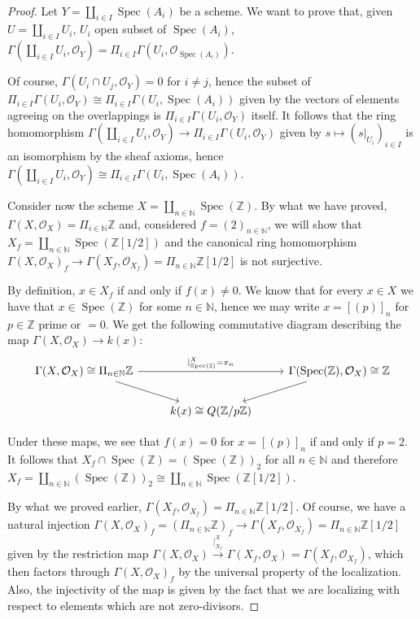 \documentclass{article}
\newcommand{\numberset}{\mathbb}
\newcommand{\N}{\numberset{N}}
\newcommand{\Z}{\numberset{Z}}
\newcommand{\exercise}[1]{\noindent {\bf Exercise #1}}
\DeclareMathOperator{\Spec}{Spec}
\begin{document}
~\\
\exercise{4}

\begin{proof}
    Let $Y=\amalg_{i\in I}\Spec(A_i)$ be a scheme. We want to prove that, given
    $U=\amalg_{i\in I} U_i$, $U_i$ open subset of $\Spec(A_i)$,
    $\Gamma(\amalg_{i\in I} U_i,\mathcal{O}_Y)=\Pi_{i\in
    I}\Gamma(U_i,\mathcal{O}_{\Spec(A_i)})$.

    Of course, $\Gamma(U_i\cap U_j,\mathcal{O}_Y)=0$ for $i\neq j$, hence the
    subset of $\Pi_{i\in I}\Gamma(U_i,\mathcal{O}_Y)\cong\Pi_{i\in
    I}\Gamma(U_i,\Spec(A_i))$ given by the vectors of elements agreeing on the
    overlappings is $\Pi_{i\in I}\Gamma(U_i,\mathcal{O}_Y)$ itself. It follows
    that the ring homomorphism $\Gamma(\amalg_{i\in I}
    U_i,\mathcal{O}_Y)\rightarrow\Pi_{i\in I}\Gamma(U_i,\mathcal{O}_Y)$ given by
    $s\mapsto (s|_{U_i})_{i\in I}$ is an isomorphism by the sheaf axioms, hence
    $\Gamma(\amalg_{i\in I}U_i,\mathcal{O}_Y)\cong\Pi_{i\in
    I}\Gamma(U_i,\Spec(A_i))$.

    Consider now the scheme $X=\amalg_{n\in\N}\Spec(\Z)$. By what we have
    proved, $\Gamma(X,\mathcal{O}_X)=\Pi_{i\in\N}\Z$ and, considered
    $f=(2)_{n\in\N}$, we will show that $X_f=\amalg_{n\in\N}\Spec(\Z[1/2])$
    and the canonical ring homomorphism
    $\Gamma(X,\mathcal{O}_X)_f\rightarrow\Gamma(X_f,\mathcal{O}_{X_f})=\Pi_{n\in\N}\Z[1/2]$
    is not surjective.
	
    By definition, $x\in X_f$ if and only if $f(x)\neq 0$. We know that for
    every $x\in X$ we have that $x\in\Spec(\Z)$ for some $n\in\N$, hence we
    may write $x=[(p)]_n$ for $p\in\Z$ prime or $=0$. We get the following
    commutative diagram describing the map
    $\Gamma(X,\mathcal{O}_X)\rightarrow k(x)$:
    \[
	\begin{tikzcd}
        	\Gamma(X,\mathcal{O}_X)\cong\Pi_{n\in\N}\Z\arrow{rr}{|^X_{\Spec(\Z)}=\pi_n}\arrow{dr}
		&& \Gamma(\Spec(\Z),\mathcal{O}_X)\arrow{dl}\cong\Z \\
		& k(x)\cong Q(\Z/p\Z)
	\end{tikzcd}
    \]
	
    Under these maps, we see that $f(x)=0$ for $x=[(p)]_n$ if and only if
    $p=2$. It follows that $X_f\cap\Spec(\Z)=(\Spec(\Z))_2$ for all $n\in\N$
    and therefore $X_f=\amalg_{n\in\N}(\Spec(\Z))_2\cong\amalg_{n\in\N}
    \Spec(\Z[1/2])$.
	
    By what we proved earlier,
    $\Gamma(X_f,\mathcal{O}_{X_f})=\Pi_{n\in\N}\Z[1/2]$. Of course, we
    have a natural injection
    $\Gamma(X,\mathcal{O}_X)_f=(\Pi_{n\in\N}\Z)_f\rightarrow\Gamma(X_f,
    \mathcal{O}_{X_f})=\Pi_{n\in\N}\Z[1/2]$ given by the restriction map
    $\Gamma(X,\mathcal{O}_X)\xrightarrow{|^X_{X_f}}\Gamma(X_f,
    \mathcal{O}_X)=\Gamma(X_f,\mathcal{O}_{X_f})$,
    which then factors through $\Gamma(X,\mathcal{O}_X)_f$ by the universal
    property of the localization. Also, the injectivity of the map is given
    by the fact that we are localizing with respect to elements which are
    not zero-divisors.


\end{proof}
\end{document}
